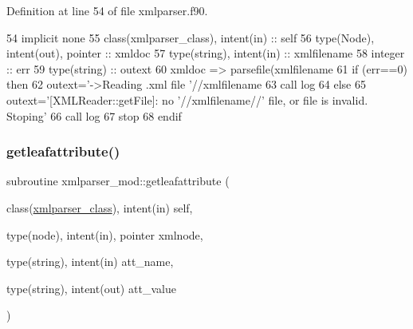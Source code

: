 Definition at line 54 of file xmlparser.\+f90.


\begin{DoxyCode}
54     \textcolor{keywordtype}{implicit none}
55     \textcolor{keywordtype}{class}(xmlparser\_class), \textcolor{keywordtype}{intent(in)} :: self
56     \textcolor{keywordtype}{type}(Node), \textcolor{keywordtype}{intent(out)}, \textcolor{keywordtype}{pointer} :: xmldoc
57     \textcolor{keywordtype}{type}(string), \textcolor{keywordtype}{intent(in)} :: xmlfilename
58     \textcolor{keywordtype}{integer} :: err
59     \textcolor{keywordtype}{type}(string) :: outext
60     xmldoc => parsefile(xmlfilename%
61     \textcolor{keywordflow}{if} (err==0) \textcolor{keywordflow}{then}
62         outext=\textcolor{stringliteral}{'->Reading .xml file '}//xmlfilename
63         \textcolor{keyword}{call }log%
64     \textcolor{keywordflow}{else}
65         outext=\textcolor{stringliteral}{'[XMLReader::getFile]: no '}//xmlfilename//\textcolor{stringliteral}{' file, or file is invalid. Stoping'}
66         \textcolor{keyword}{call }log%
67         stop
68 \textcolor{keywordflow}{    endif}
\end{DoxyCode}
\mbox{\label{namespacexmlparser__mod_a3e977c7792b08b009a09cc1f7fb4f80a}} 
\subsubsection{\texorpdfstring{getleafattribute()}{getleafattribute()}}
{\footnotesize\ttfamily subroutine xmlparser\+\_\+mod\+::getleafattribute (\begin{DoxyParamCaption}\item[{class(\mbox{\hyperlink{structxmlparser__mod_1_1xmlparser__class}{xmlparser\+\_\+class}}), intent(in)}]{self,  }\item[{type(node), intent(in), pointer}]{xmlnode,  }\item[{type(string), intent(in)}]{att\+\_\+name,  }\item[{type(string), intent(out)}]{att\+\_\+value }\end{DoxyParamCaption})\hspace{0.3cm}{\ttfamily [private]}}



